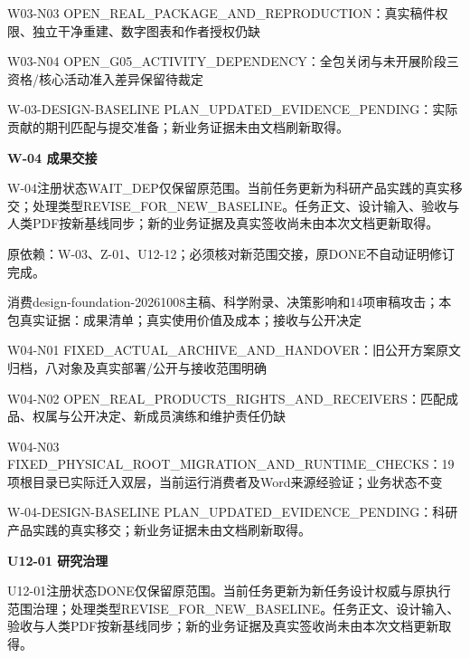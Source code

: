 \documentclass[11pt,a4paper]{article}
\newcommand{\reviewsection}[1]{\par\Needspace{5\baselineskip}\vspace{10pt}\begin{center}{\titlelatin\titlecjk\bfseries\fontsize{14}{20}\selectfont #1}\end{center}}
\begin{document}
W03-\allowbreak{}N03 OPEN\_\allowbreak{}REAL\_\allowbreak{}PACKAGE\_\allowbreak{}AND\_\allowbreak{}REPRODUCTION：真实稿件权限、独立干净重建、数字图表和作者授权仍缺


W03-\allowbreak{}N04 OPEN\_\allowbreak{}G05\_\allowbreak{}ACTIVITY\_\allowbreak{}DEPENDENCY：全包关闭与未开展阶段三资格/\allowbreak{}核心活动准入差异保留待裁定


W-\allowbreak{}03-\allowbreak{}DESIGN-\allowbreak{}BASELINE PLAN\_\allowbreak{}UPDATED\_\allowbreak{}EVIDENCE\_\allowbreak{}PENDING：实际贡献的期刊匹配与提交准备；新业务证据未由文档刷新取得。


\reviewsection{W-\allowbreak{}04 成果交接}
W-\allowbreak{}04注册状态WAIT\_\allowbreak{}DEP仅保留原范围。当前任务更新为科研产品实践的真实移交；处理类型REVISE\_\allowbreak{}FOR\_\allowbreak{}NEW\_\allowbreak{}BASELINE。任务正文、设计输入、验收与人类PDF按新基线同步；新的业务证据及真实签收尚未由本次文档更新取得。


原依赖：W-\allowbreak{}03、Z-\allowbreak{}01、U12-\allowbreak{}12；必须核对新范围交接，原DONE不自动证明修订完成。


消费design-\allowbreak{}foundation-\allowbreak{}20261008主稿、科学附录、决策影响和14项审稿攻击；本包真实证据：成果清单；真实使用价值及成本；接收与公开决定


W04-\allowbreak{}N01 FIXED\_\allowbreak{}ACTUAL\_\allowbreak{}ARCHIVE\_\allowbreak{}AND\_\allowbreak{}HANDOVER：旧公开方案原文归档，八对象及真实部署/\allowbreak{}公开与接收范围明确


W04-\allowbreak{}N02 OPEN\_\allowbreak{}REAL\_\allowbreak{}PRODUCTS\_\allowbreak{}RIGHTS\_\allowbreak{}AND\_\allowbreak{}RECEIVERS：匹配成品、权属与公开决定、新成员演练和维护责任仍缺


W04-\allowbreak{}N03 FIXED\_\allowbreak{}PHYSICAL\_\allowbreak{}ROOT\_\allowbreak{}MIGRATION\_\allowbreak{}AND\_\allowbreak{}RUNTIME\_\allowbreak{}CHECKS：19项根目录已实际迁入双层，当前运行消费者及Word来源经验证；业务状态不变


W-\allowbreak{}04-\allowbreak{}DESIGN-\allowbreak{}BASELINE PLAN\_\allowbreak{}UPDATED\_\allowbreak{}EVIDENCE\_\allowbreak{}PENDING：科研产品实践的真实移交；新业务证据未由文档刷新取得。


\reviewsection{U12-\allowbreak{}01 研究治理}
U12-\allowbreak{}01注册状态DONE仅保留原范围。当前任务更新为新任务设计权威与原执行范围治理；处理类型REVISE\_\allowbreak{}FOR\_\allowbreak{}NEW\_\allowbreak{}BASELINE。任务正文、设计输入、验收与人类PDF按新基线同步；新的业务证据及真实签收尚未由本次文档更新取得。
\end{document}
